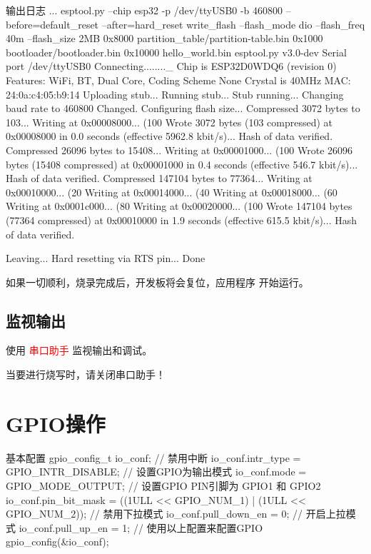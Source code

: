\documentclass[lang=cn,newtx,10pt,scheme=chinese]{elegantbook}
\begin{document}
\begin{mycode}{输出日志}
...
esptool.py --chip esp32 -p /dev/ttyUSB0 -b 460800 --before=default_reset --after=hard_reset write_flash --flash_mode dio --flash_freq 40m --flash_size 2MB 0x8000 partition_table/partition-table.bin 0x1000 bootloader/bootloader.bin 0x10000 hello_world.bin
esptool.py v3.0-dev
Serial port /dev/ttyUSB0
Connecting........_
Chip is ESP32D0WDQ6 (revision 0)
Features: WiFi, BT, Dual Core, Coding Scheme None
Crystal is 40MHz
MAC: 24:0a:c4:05:b9:14
Uploading stub...
Running stub...
Stub running...
Changing baud rate to 460800
Changed.
Configuring flash size...
Compressed 3072 bytes to 103...
Writing at 0x00008000... (100 %
Wrote 3072 bytes (103 compressed) at 0x00008000 in 0.0 seconds (effective 5962.8 kbit/s)...
Hash of data verified.
Compressed 26096 bytes to 15408...
Writing at 0x00001000... (100 %
Wrote 26096 bytes (15408 compressed) at 0x00001000 in 0.4 seconds (effective 546.7 kbit/s)...
Hash of data verified.
Compressed 147104 bytes to 77364...
Writing at 0x00010000... (20 %
Writing at 0x00014000... (40 %
Writing at 0x00018000... (60 %
Writing at 0x0001c000... (80 %
Writing at 0x00020000... (100 %
Wrote 147104 bytes (77364 compressed) at 0x00010000 in 1.9 seconds (effective 615.5 kbit/s)...
Hash of data verified.

Leaving...
Hard resetting via RTS pin...
Done
\end{mycode}

如果一切顺利，烧录完成后，开发板将会复位，应用程序  开始运行。

\section{监视输出}

使用 \textcolor{red}{串口助手} 监视输出和调试。

\begin{marker}
当要进行烧写时，请关闭串口助手！
\end{marker}

\chapter{GPIO操作}

\begin{mycode}{基本配置}
gpio_config_t io_conf;
// 禁用中断
io_conf.intr_type = GPIO_INTR_DISABLE;
// 设置GPIO为输出模式
io_conf.mode = GPIO_MODE_OUTPUT;
// 设置GPIO PIN引脚为 GPIO1 和 GPIO2
io_conf.pin_bit_mask = ((1ULL << GPIO_NUM_1) | (1ULL << GPIO_NUM_2));
// 禁用下拉模式
io_conf.pull_down_en = 0;
// 开启上拉模式
io_conf.pull_up_en = 1;
// 使用以上配置来配置GPIO
gpio_config(&io_conf);
\end{mycode}
\end{document}
